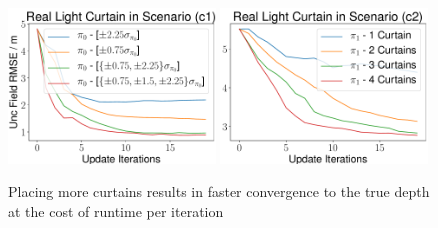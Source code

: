 \begin{figure}[h]
    \centering
    \begin{minipage}{0.5\textwidth}
        \centering
        \includegraphics[width=0.49\textwidth]{figures/Figure_3.pdf}
        \includegraphics[width=0.49\textwidth]{figures/Figure_4.pdf}
    \end{minipage}\hfill
    \centering
    \caption{Placing more curtains results in faster convergence to the true depth at the cost of runtime per iteration}
    \label{fig:figure34}
\end{figure}


